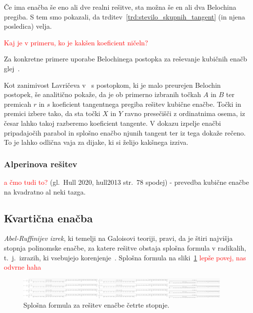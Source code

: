 Če ima enačba še eno ali dve realni rešitve, sta možna še en ali dva Belochina pregiba. S tem smo pokazali, da trditev~\ref{trd:stevilo_skupnih_tangent} (in njena posledica) velja.


\textcolor{red}{Kaj je v primeru, ko je kakšen koeficient ničeln?}

Za konkretne primere uporabe Belochinega postopka za reševanje kubičnih enačb glej~\cite[38--44]{zore2022}.

Kot zanimivost Lavričeva v~\cite[str.\ 10--13]{lavric2013} s postopkom, ki je malo preurejen Belochin postopek, še analitično pokaže, da je ob primerno izbranih točkah $A$ in $B$ ter premicah $r$ in $s$ koeficient tangentnega pregiba rešitev kubične enačbe. Točki in premici izbere tako, da sta točki $X$ in $Y$ ravno presečišči z ordinatnima osema, iz česar lahko takoj razberemo koeficient tangente. V dokazu izpelje enačbi pripadajočih parabol in splošno enačbo njunih tangent ter iz tega dokaže rečeno. To je lahko odlična vaja za dijake, ki si želijo kakšnega izziva.

\subsubsection{Alperinova rešitev}

\textcolor{red}{a čmo tudi to?} (gl.\ Hull 2020, hull2013 str.\ 78 spodej) - prevedba kubične enačbe na kvadratno al neki tazga.

\subsection{Kvartična enačba}

\emph{Abel-Ruffinijev izrek}, ki temelji na Galoisovi teoriji, pravi, da je štiri najvišja stopnja polinomske enačbe, za katere rešitve obstaja splošna formula v radikalih, t.\ j.\ izrazih, ki vsebujejo korenjenje~\cite{mrinal2019}. Splošna formula na sliki~\ref{fig:kvarticna_formula} \textcolor{red}{lepše povej, nas odvrne haha}

\begin{figure}[h]
    \centering
    \includegraphics[width=0.95\textwidth]{images/quartic_formula.png}
    \caption[Kvartična formula]{Splošna formula za rešitev enačbe četrte stopnje.}
    \label{fig:kvarticna_formula}
\end{figure}

